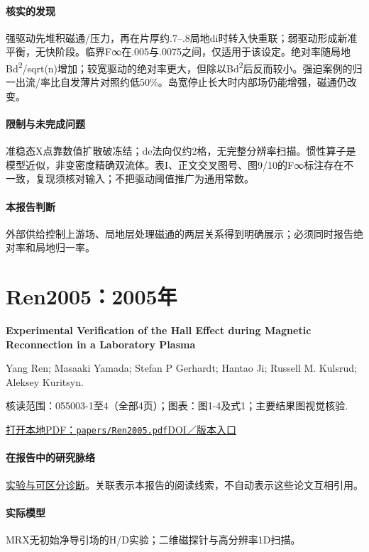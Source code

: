 \paragraph{核实的发现}强驱动先堆积磁通/压力，再在片厚约.7–.8局地di时转入快重联；弱驱动形成新准平衡，无快阶段。临界F∞在.005与.0075之间，仅适用于该设定。绝对率随局地Bd\textsuperscript{2}/sqrt(n)增加；较宽驱动的绝对率更大，但除以Bd\textsuperscript{2}后反而较小。强迫案例的归一出流/率比自发薄片对照约低50\%。岛宽停止长大时内部场仍能增强，磁通仍改变。

\paragraph{限制与未完成问题}准稳态X点靠数值扩散破冻结；de法向仅约2格，无完整分辨率扫描。惯性算子是模型近似，非变密度精确双流体。表I、正文交叉图号、图9/10的F∞标注存在不一致，复现须核对输入；不把驱动阈值推广为通用常数。

\paragraph{本报告判断}外部供给控制上游场、局地层处理磁通的两层关系得到明确展示；必须同时报告绝对率和局地归一率。

\section{Ren2005：2005年}\label{paper:Ren2005}

\textbf{Experimental Verification of the Hall Effect during Magnetic Reconnection in a Laboratory Plasma}\citep{Ren2005}\

Yang Ren;  Masaaki Yamada;  Stefan P Gerhardt;  Hantao Ji;  Russell M. Kulsrud;  Aleksey Kuritsyn.

\textsf{核读范围：}055003-1至4（全部4页）；\textsf{图表：}图1-4及式1；主要结果图视觉核验.

\href{run:papers/Ren2005.pdf}{打开本地PDF：\texttt{papers/Ren2005.pdf}}\quad\href{https://doi.org/10.1103/physrevlett.95.055003}{DOI／版本入口}

\paragraph{在报告中的研究脉络}\hyperref[story:diagnostic]{实验与可区分诊断}。关联表示本报告的阅读线索，不自动表示这些论文互相引用。

\paragraph{实际模型}MRX无初始净导引场的H/D实验；二维磁探针与高分辨率1D扫描。

